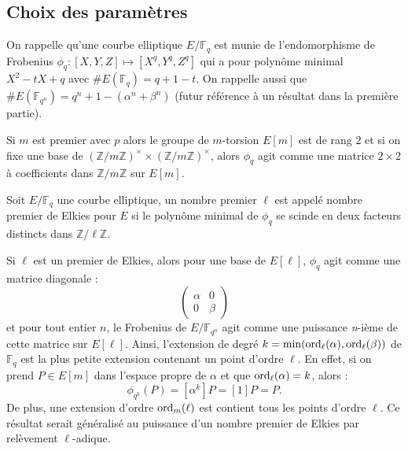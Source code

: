 \documentclass[a4paper]{article} %
\numberwithin{section}{part}
\numberwithin{equation}{section}
\newcommand\nroot[1]{\textit{#1}-ième}
\newcommand\zmodn[1]{\mathbb{Z}/#1\mathbb{Z}}
\newcommand\zmodninv[1]{(\mathbb{Z}/#1\mathbb{Z})^{\times}}
\newcommand\GF[1]{\mathbb{F}_{#1}}
\newcommand\ord[2]{\textup{ord}_{#1}(#2)}
\begin{document}
\subsection{Choix des paramètres}
\label{sec:choixparam}
On rappelle qu'une courbe elliptique $E/\GF{q}$ est munie de l'endomorphisme de
Frobenius $\phi_q : [X, Y, Z] \mapsto [X^q, Y^q, Z^q]$ qui a pour polynôme
minimal $X^2 -tX + q$ avec $\#E(\GF{q}) = q + 1 - t$. On rappelle aussi que 
$\#E(\GF{q^n}) = q^n + 1 - (\alpha^n + \beta^n)$ (futur référence à un résultat 
dans la première partie).\par
Si $m$ est premier avec $p$ alors le groupe de $m$-torsion $E[m]$ est de rang
$2$ et si on fixe une base de $\zmodninv{m}\times\zmodninv{m}$, alors $\phi_q$ 
agit comme une matrice $2\times2$ à coefficients dans $\zmodn{m}$ sur $E[m]$.
\begin{defn}
Soit $E/\GF{q}$ une courbe elliptique, un nombre premier $\ell$ est appelé
nombre premier de Elkies pour $E$ si le polynôme minimal de $\phi_q$ se scinde
en deux facteurs distincts dans $\zmodn{\ell}$.
\end{defn}
Si $\ell$ est un premier de Elkies, alors pour une base de $E[\ell]$, $\phi_q$
agit comme une matrice diagonale :
\begin{equation}
\begin{pmatrix}
\alpha & 0\\
0 & \beta
\end{pmatrix}
\end{equation}
et pour tout entier $n$, le Frobenius de $E/\GF{q^n}$ agit comme une puissance
\nroot{n} de cette matrice sur $E[\ell]$. Ainsi, l'extension de degré
$k = \textup{min}(\ord{\ell}{\alpha},\ord{\ell}{\beta})$ de 
$\GF{q}$ est la plus petite extension contenant un point d'ordre $\ell$. En
effet, si on prend $P\in E[m]$ dans l'espace propre de $\alpha$  et que 
$\ord{\ell}{\alpha} = k$, alors :
\begin{equation}
\phi_{q^k}(P) = [\alpha^k]P = [1]P = P.
\end{equation}
De plus, une extension d'ordre $\ord{m}{\ell}$ est contient tous les 
points d'ordre $\ell$. Ce résultat serait généralisé au puissance d'un nombre 
premier de Elkies par relèvement $\ell$-adique.\par 
\end{document}
